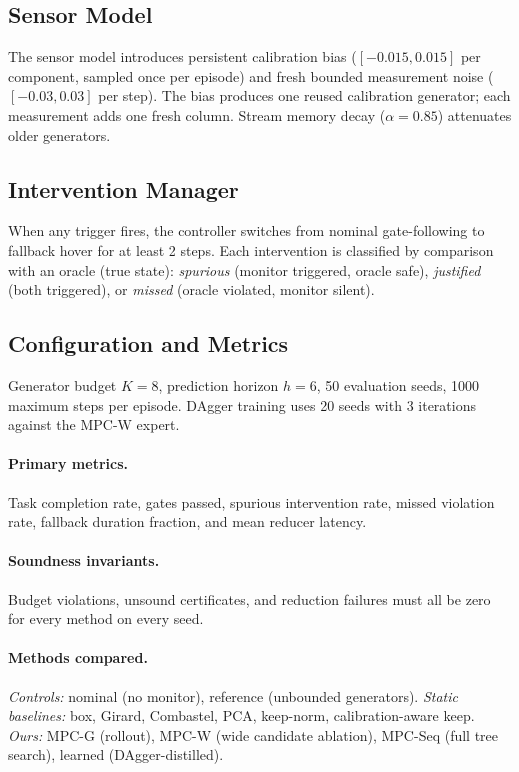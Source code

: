 \documentclass{article}
\begin{document}
\subsection{Sensor Model}

The sensor model introduces persistent calibration bias ($[-0.015, 0.015]$ per component, sampled once per episode) and fresh bounded measurement noise ($[-0.03, 0.03]$ per step).
The bias produces one reused calibration generator; each measurement adds one fresh column.
Stream memory decay ($\alpha = 0.85$) attenuates older generators.

\subsection{Intervention Manager}

When any trigger fires, the controller switches from nominal gate-following to fallback hover for at least 2 steps.
Each intervention is classified by comparison with an oracle (true state): \emph{spurious} (monitor triggered, oracle safe), \emph{justified} (both triggered), or \emph{missed} (oracle violated, monitor silent).

\subsection{Configuration and Metrics}

Generator budget $K = 8$, prediction horizon $h = 6$, 50 evaluation seeds, 1000 maximum steps per episode.
DAgger training uses 20 seeds with 3 iterations against the MPC-W expert.

\paragraph{Primary metrics.}
Task completion rate, gates passed, spurious intervention rate, missed violation rate, fallback duration fraction, and mean reducer latency.

\paragraph{Soundness invariants.}
Budget violations, unsound certificates, and reduction failures must all be zero for every method on every seed.

\paragraph{Methods compared.}
\emph{Controls:} nominal (no monitor), reference (unbounded generators).
\emph{Static baselines:} box, Girard, Combastel, PCA, keep-norm, calibration-aware keep.
\emph{Ours:} MPC-G (rollout), MPC-W (wide candidate ablation), MPC-Seq (full tree search), learned (DAgger-distilled).
\end{document}
